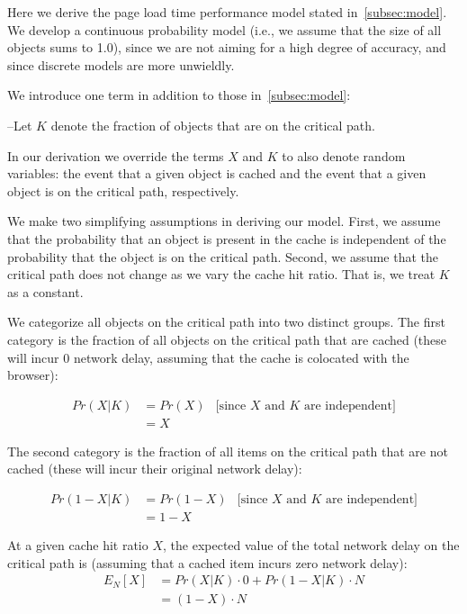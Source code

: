 Here we derive the page load time performance model stated in~\ref{subsec:model}. We
develop a continuous probability model (i.e., we assume that the size of all
objects sums to 1.0), since we are not aiming for a high degree of accuracy,
and since discrete models are more unwieldly.


We introduce one term in addition to those in~\ref{subsec:model}:

\noindent--Let $K$ denote the fraction of objects that are on the critical path.

In our derivation we override the terms $X$ and $K$ to also denote random
variables: the event that a given object is cached and the event that a given
object is on the critical path, respectively.

We make two simplifying assumptions in deriving our model. First, we assume that the probability that an
object is present in the cache is independent of the probability that the object is on the critical path.
Second, we assume that the critical path does not change as we vary the cache hit
ratio. That is, we treat $K$ as a constant.

We categorize all objects on the critical path into two distinct groups.
The first category is the fraction of all objects on the critical path that are cached (these
will incur 0 network delay, assuming that the cache is colocated with the
browser):

\begin{align*}
Pr(X|K) & =  Pr(X) & \text{[since $X$ and $K$ are independent]} \\
& = X &
\end{align*}

The second category is the fraction of all items on the critical path that are not cached (these will incur their original network delay):

\begin{align*}
Pr(1-X | K) & = Pr(1-X) & \text{[since $X$ and $K$ are independent]} \\
& = 1-X &
\end{align*}

At a given cache hit ratio $X$, the expected value of the total network delay
on the critical path is (assuming that a cached item incurs zero network delay):
\begin{align*}
E_N[X] & = Pr(X|K) \cdot 0 + Pr(1-X|K) \cdot N \\
& = (1 - X) \cdot N
\end{align*}

